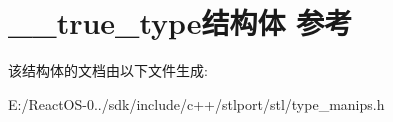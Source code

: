 \hypertarget{struct____true__type}{}\section{\+\_\+\+\_\+true\+\_\+type结构体 参考}
\label{struct____true__type}


该结构体的文档由以下文件生成\+:\begin{DoxyCompactItemize}
\item 
E\+:/\+React\+O\+S-\/0../sdk/include/c++/stlport/stl/type\+\_\+manips.\+h\end{DoxyCompactItemize}
